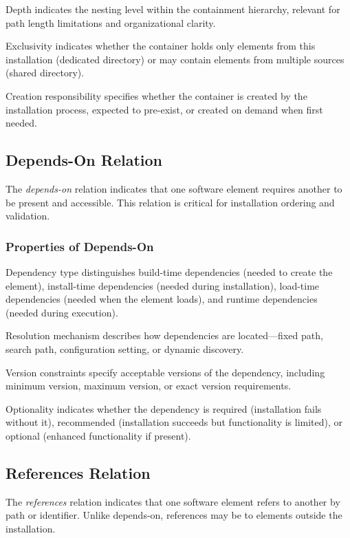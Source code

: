 \documentclass[11pt]{article}
\begin{document}
Depth indicates the nesting level within the containment hierarchy, relevant for path length limitations and organizational clarity.

Exclusivity indicates whether the container holds only elements from this installation (dedicated directory) or may contain elements from multiple sources (shared directory).

Creation responsibility specifies whether the container is created by the installation process, expected to pre-exist, or created on demand when first needed.

\subsection{Depends-On Relation}

The \textit{depends-on} relation indicates that one software element requires another to be present and accessible. This relation is critical for installation ordering and validation.

\subsubsection{Properties of Depends-On}

Dependency type distinguishes build-time dependencies (needed to create the element), install-time dependencies (needed during installation), load-time dependencies (needed when the element loads), and runtime dependencies (needed during execution).

Resolution mechanism describes how dependencies are located---fixed path, search path, configuration setting, or dynamic discovery.

Version constraints specify acceptable versions of the dependency, including minimum version, maximum version, or exact version requirements.

Optionality indicates whether the dependency is required (installation fails without it), recommended (installation succeeds but functionality is limited), or optional (enhanced functionality if present).

\subsection{References Relation}

The \textit{references} relation indicates that one software element refers to another by path or identifier. Unlike depends-on, references may be to elements outside the installation.
\end{document}
